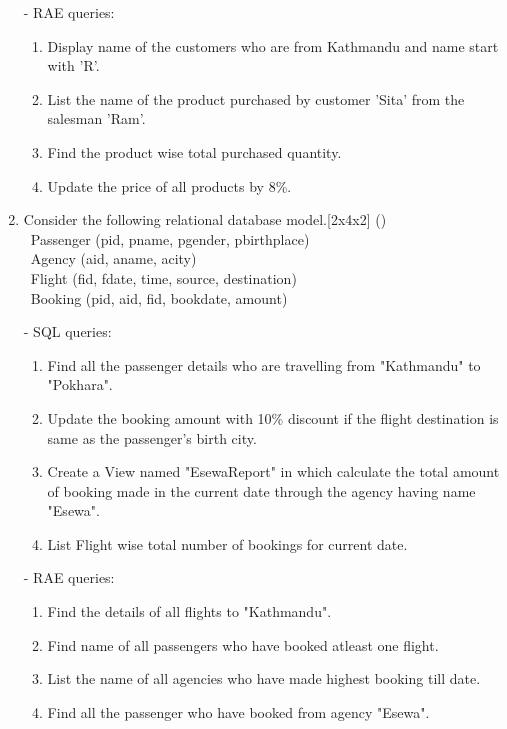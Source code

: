 \documentclass[12pt]{article}
\newcommand{\enter}{\\\textcolor{white}{1}}
\begin{document}
\begin{enumerate}
        - RAE queries: 
        \begin{enumerate}[noitemsep, topsep = 0pt, label = \alph*.]
            \item Display name of the customers who are from Kathmandu and name start with 'R'.
            \item List the name of the product purchased by customer 'Sita' from the salesman 'Ram'.
            \item Find the product wise total purchased quantity.
            \item Update the price of all products by 8\%.
        \end{enumerate}

    \item Consider the following relational database model.\hfill[2x4x2] ()
        \enter Passenger (pid, pname, pgender, pbirthplace)
        \enter Agency (aid, aname, acity)
        \enter Flight (fid, fdate, time, source, destination)
        \enter Booking (pid, aid, fid, bookdate, amount)
        
        - SQL queries:  
        \begin{enumerate}[noitemsep, topsep = 0pt, label = \alph*.]
            \item Find all the passenger details who are travelling from "Kathmandu" to "Pokhara".
            \item Update the booking amount with 10\% discount if the flight destination is same as the passenger's birth city.
            \item Create a View named "EsewaReport" in which calculate the total amount of booking made in the current date through the agency having name "Esewa".
            \item List Flight wise total number of bookings for current date.
        \end{enumerate}

        - RAE queries: 
        \begin{enumerate}[noitemsep, topsep = 0pt, label = \alph*.]
            \item Find the details of all flights to "Kathmandu".
            \item Find name of all passengers who have booked atleast one flight.
            \item List the name of all agencies who have made highest booking till date.
            \item Find all the passenger who have booked from agency "Esewa".
        \end{enumerate}


\end{enumerate}
\end{document}
